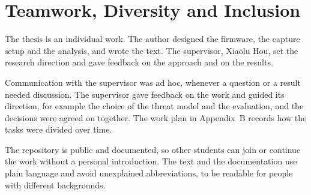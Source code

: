 \chapter{Teamwork, Diversity and Inclusion}
\label{chap:teamwork}

The thesis is an individual work.
The author designed the firmware, the capture setup and the analysis, and wrote the text.
The supervisor, Xiaolu Hou, set the research direction and gave feedback on the approach and on the results.

Communication with the supervisor was ad hoc, whenever a question or a result needed discussion.
The supervisor gave feedback on the work and guided its direction, for example the choice of the threat model and the evaluation, and the decisions were agreed on together.
The work plan in Appendix~B records how the tasks were divided over time.

The repository is public and documented, so other students can join or continue the work without a personal introduction.
The text and the documentation use plain language and avoid unexplained abbreviations, to be readable for people with different backgrounds.
